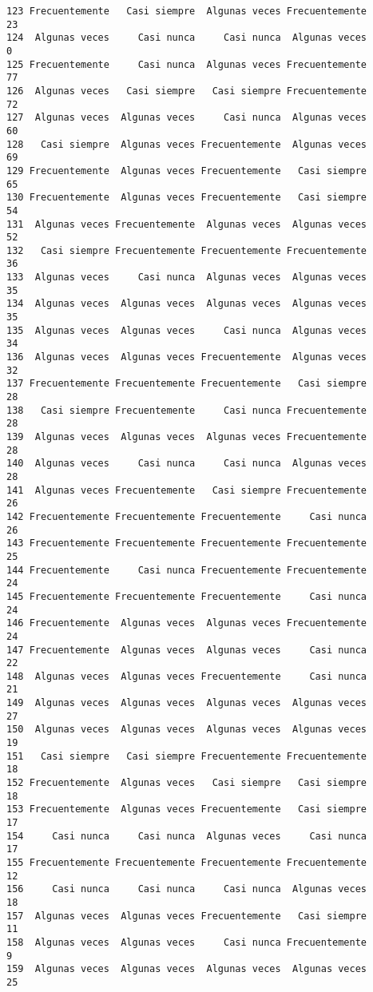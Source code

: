 \documentclass[
  letterpaper,
  DIV=11,
  numbers=noendperiod]{scrartcl}
\begin{document}
\begin{verbatim}
123 Frecuentemente   Casi siempre  Algunas veces Frecuentemente      23
124  Algunas veces     Casi nunca     Casi nunca  Algunas veces       0
125 Frecuentemente     Casi nunca  Algunas veces Frecuentemente      77
126  Algunas veces   Casi siempre   Casi siempre Frecuentemente      72
127  Algunas veces  Algunas veces     Casi nunca  Algunas veces      60
128   Casi siempre  Algunas veces Frecuentemente  Algunas veces      69
129 Frecuentemente  Algunas veces Frecuentemente   Casi siempre      65
130 Frecuentemente  Algunas veces Frecuentemente   Casi siempre      54
131  Algunas veces Frecuentemente  Algunas veces  Algunas veces      52
132   Casi siempre Frecuentemente Frecuentemente Frecuentemente      36
133  Algunas veces     Casi nunca  Algunas veces  Algunas veces      35
134  Algunas veces  Algunas veces  Algunas veces  Algunas veces      35
135  Algunas veces  Algunas veces     Casi nunca  Algunas veces      34
136  Algunas veces  Algunas veces Frecuentemente  Algunas veces      32
137 Frecuentemente Frecuentemente Frecuentemente   Casi siempre      28
138   Casi siempre Frecuentemente     Casi nunca Frecuentemente      28
139  Algunas veces  Algunas veces  Algunas veces Frecuentemente      28
140  Algunas veces     Casi nunca     Casi nunca  Algunas veces      28
141  Algunas veces Frecuentemente   Casi siempre Frecuentemente      26
142 Frecuentemente Frecuentemente Frecuentemente     Casi nunca      26
143 Frecuentemente Frecuentemente Frecuentemente Frecuentemente      25
144 Frecuentemente     Casi nunca Frecuentemente Frecuentemente      24
145 Frecuentemente Frecuentemente Frecuentemente     Casi nunca      24
146 Frecuentemente  Algunas veces  Algunas veces Frecuentemente      24
147 Frecuentemente  Algunas veces  Algunas veces     Casi nunca      22
148  Algunas veces  Algunas veces Frecuentemente     Casi nunca      21
149  Algunas veces  Algunas veces  Algunas veces  Algunas veces      27
150  Algunas veces  Algunas veces  Algunas veces  Algunas veces      19
151   Casi siempre   Casi siempre Frecuentemente Frecuentemente      18
152 Frecuentemente  Algunas veces   Casi siempre   Casi siempre      18
153 Frecuentemente  Algunas veces Frecuentemente   Casi siempre      17
154     Casi nunca     Casi nunca  Algunas veces     Casi nunca      17
155 Frecuentemente Frecuentemente Frecuentemente Frecuentemente      12
156     Casi nunca     Casi nunca     Casi nunca  Algunas veces      18
157  Algunas veces  Algunas veces Frecuentemente   Casi siempre      11
158  Algunas veces  Algunas veces     Casi nunca Frecuentemente       9
159  Algunas veces  Algunas veces  Algunas veces  Algunas veces      25

\end{verbatim}
\end{document}
